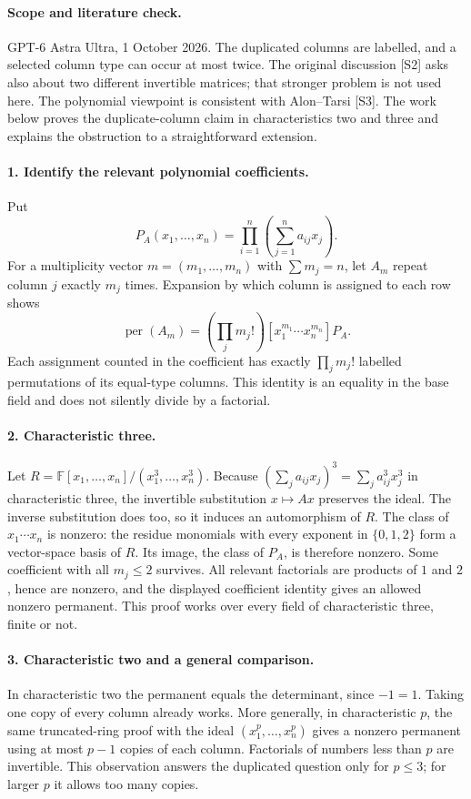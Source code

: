 \documentclass[11pt,a4paper]{article}
\begin{document}
\paragraph{Scope and literature check.}
GPT-6 Astra Ultra, 1 October 2026. The duplicated columns are labelled,
and a selected column type can occur at most twice. The original
discussion [S2] asks also about two different invertible matrices; that
stronger problem is not used here. The polynomial viewpoint is consistent
with Alon--Tarsi [S3]. The work below proves the duplicate-column claim
in characteristics two and three and explains the obstruction to a
straightforward extension.

\paragraph{1. Identify the relevant polynomial coefficients.}
Put
\[
 P_A(x_1,\ldots,x_n)=\prod_{i=1}^n\left(\sum_{j=1}^n a_{ij}x_j\right).
\]
For a multiplicity vector $m=(m_1,\ldots,m_n)$ with $\sum m_j=n$,
let $A_m$ repeat column $j$ exactly $m_j$ times. Expansion by which
column is assigned to each row shows
\[
 \operatorname{per}(A_m)=
 \left(\prod_j m_j!\right)[x_1^{m_1}\cdots x_n^{m_n}]P_A.
\]
Each assignment counted in the coefficient has exactly
$\prod_jm_j!$ labelled permutations of its equal-type columns. This
identity is an equality in the base field and does not silently divide
by a factorial.

\paragraph{2. Characteristic three.}
Let $R=\mathbb F[x_1,\ldots,x_n]/(x_1^3,\ldots,x_n^3)$.
Because $(\sum_j a_{ij}x_j)^3=\sum_j a_{ij}^3x_j^3$ in
characteristic three, the invertible substitution $x\mapsto Ax$
preserves the ideal. The inverse substitution does too, so it induces
an automorphism of $R$. The class of $x_1\cdots x_n$ is nonzero:
the residue monomials with every exponent in $\{0,1,2\}$ form a
vector-space basis of $R$. Its image, the class of $P_A$, is therefore
nonzero. Some coefficient with all $m_j\le2$ survives. All relevant
factorials are products of $1$ and $2$, hence are nonzero, and the
displayed coefficient identity gives an allowed nonzero permanent.
This proof works over every field of characteristic three, finite or not.

\paragraph{3. Characteristic two and a general comparison.}
In characteristic two the permanent equals the determinant, since
$-1=1$. Taking one copy of every column already works. More generally,
in characteristic $p$, the same truncated-ring proof with the ideal
$(x_1^p,\ldots,x_n^p)$ gives a nonzero permanent using at most $p-1$
copies of each column. Factorials of numbers less than $p$ are invertible.
This observation answers the duplicated question only for $p\le3$;
for larger $p$ it allows too many copies.
\end{document}
